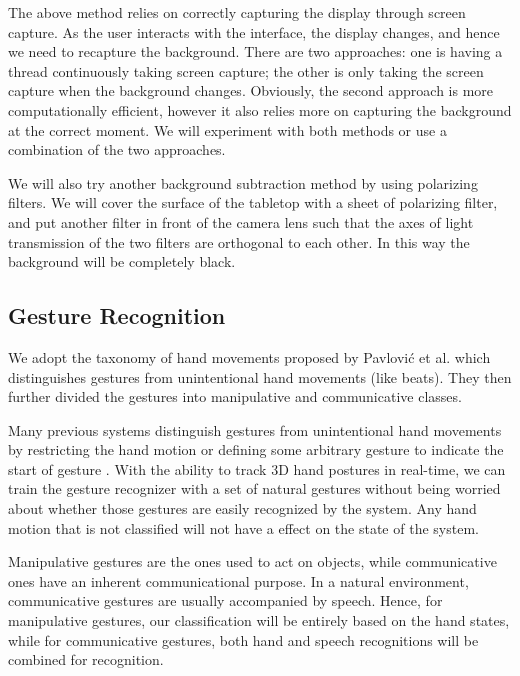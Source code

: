 The above method relies on correctly capturing the display through screen capture. As the user interacts with the interface, the display changes, and hence we need to recapture the background. There are two approaches: one is having a thread continuously taking screen capture; the other is only taking the screen capture when the background changes. Obviously, the second approach is more computationally efficient, however it also relies more on capturing the background at the correct moment. We will experiment with both methods or use a combination of the two approaches.

We will also try another background subtraction method by using polarizing filters. We will cover the surface of the tabletop with a sheet of polarizing filter, and put another filter in front of the camera lens such that the axes of light transmission of the two filters are orthogonal to each other. In this way the background will be completely black.
   
\subsection{Gesture Recognition}
We adopt the taxonomy of hand movements proposed by Pavlovi\'{c} et al. \cite{Pavlovic97} which distinguishes gestures from unintentional hand movements (like beats). They then further divided the gestures into manipulative and communicative classes. 

Many previous systems distinguish gestures from unintentional hand movements by restricting the hand motion or defining some arbitrary gesture to indicate the start of gesture \cite{Shin04}. With the ability to track 3D hand postures in real-time, we can train the gesture recognizer with a set of natural gestures without being worried about whether those gestures are easily recognized by the system. Any hand motion that is not classified will not have a effect on the state of the system.

Manipulative gestures are the ones used to act on objects, while communicative ones have an inherent communicational purpose\cite{Pavlovic97}. In a natural environment, communicative gestures are usually accompanied by speech. Hence, for manipulative gestures, our classification will be entirely based on the hand states, while for communicative gestures, both hand and speech recognitions will be combined for recognition. 

